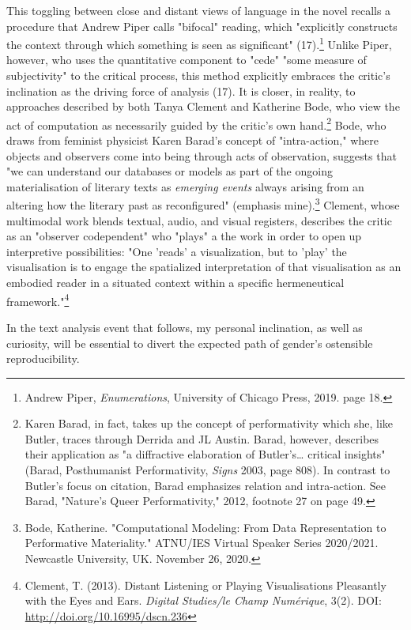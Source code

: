 \documentclass[11pt]{article}
\begin{document}
This toggling between close and distant views of language in the novel
recalls a procedure that Andrew Piper calls "bifocal" reading, which
"explicitly constructs the context through which something is seen as
significant" (17).\footnote{Andrew Piper, \emph{Enumerations}, University of Chicago
Press, 2019. page 18.} Unlike Piper, however, who uses the
quantitative component to "cede" "some measure of subjectivity" to the
critical process, this method explicitly embraces the critic's
inclination as the driving force of analysis (17). It is closer, in
reality, to approaches described by both Tanya Clement and Katherine
Bode, who view the act of computation as necessarily guided by the
critic's own hand.\footnote{Karen Barad, in fact, takes up the concept of performativity
which she, like Butler, traces through Derrida and JL Austin. Barad,
however, describes their application as "a diffractive elaboration of
Butler's\ldots{} critical insights" (Barad, Posthumanist Performativity,
\emph{Signs} 2003, page 808). In contrast to Butler's focus on citation,
Barad emphasizes relation and intra-action. See Barad, "Nature's Queer
Performativity," 2012, footnote 27 on page 49.} Bode, who draws from feminist physicist
Karen Barad's concept of "intra-action," where objects and observers
come into being through acts of observation, suggests that "we can
understand our databases or models as part of the ongoing
materialisation of literary texts as \emph{emerging events} always arising
from an altering how the literary past as reconfigured" (emphasis
mine).\footnote{Bode, Katherine. "Computational Modeling: From Data
Representation to Performative Materiality." ATNU/IES Virtual Speaker
Series 2020/2021. Newcastle University, UK. November 26, 2020.} Clement, whose multimodal work blends textual, audio,
and visual registers, describes the critic as an "observer
codependent" who "plays" a the work in order to open up interpretive
possibilities: "One 'reads' a visualization, but to 'play' the
visualisation is to engage the spatialized interpretation of that
visualisation as an embodied reader in a situated context within a
specific hermeneutical framework."\footnote{Clement, T. (2013). Distant Listening or Playing
Visualisations Pleasantly with the Eyes and Ears. \emph{Digital Studies/le
Champ Numérique}, 3(2). DOI: \url{http://doi.org/10.16995/dscn.236}}

In the text analysis event that follows, my personal inclination, as
well as curiosity, will be essential to divert the expected path of
gender's ostensible reproducibility.
\end{document}
